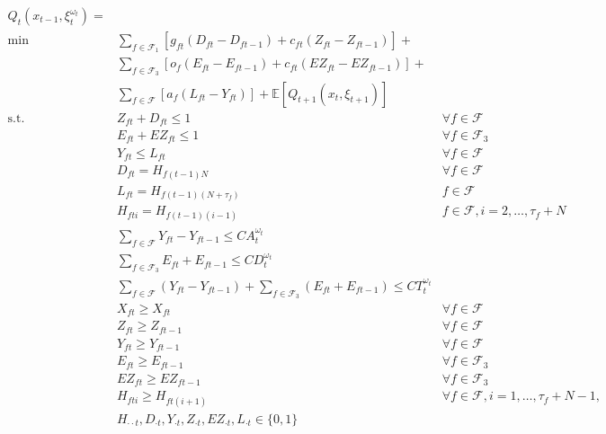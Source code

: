 \documentclass[12pt]{article}
\begin{document}
	\begin{subequations}
		\begin{align}
		Q_t(x_{t-1}, \xi^{\omega_t}_t)  = & &\\
		\min \quad & \sum_{f \in \mathcal{F}_1} \left[ g_{ft} (D_{ft} - D_{ft - 1}) + c_{ft} (Z_{ft} - Z_{ft - 1}) \right]  + & \nonumber \\
		& \sum_{f \in \mathcal{F}_3} \left[ o_f(E_{ft} - E_{ft - 1}) + c_{ft}(EZ_{ft} - EZ_{ft - 1}) \right] + & \nonumber\\ 
		& \sum_{f \in \mathcal{F}} \left[ a_f (L_{ft} - Y_{ft})\right]  + \mathbb{E}\left[Q_{t+1}(x_{t},\xi_{t+1}) \right] &\\
		\text{s.t.} \quad & Z_{ft} + D_{ft} \leq 1 & \forall f \in \mathcal{F} \label{cons:cancelORTOt}\\
		& E_{ft} + EZ_{ft} \leq 1 & \forall f \in \mathcal{F}_3 \label{cons:cancelTO2t}\\
		& Y_{ft} \leq L_{ft} & \forall f \in \mathcal{F} \label{cons:arrlandt}\\
		& D_{ft} = H_{f(t-1)N} & \forall f \in \mathcal{F} \label{cons:TOHistt1}\\
		& L_{ft} = H_{f(t-1)(N+\tau_{f})}& f \in \mathcal{F} \label{cons:landHistt}\\
		& H_{fti} = H_{f(t-1)(i-1)} & f \in \mathcal{F}, i = 2, \dots, \tau_{f} + N \label{cons:planHistt}\\
		& \sum_{f \in \mathcal{F}} Y_{ft} - Y_{ft - 1} \leq CA^{\omega_t}_t & \label{cons:arrCapt}\\
		& \sum_{f \in \mathcal{F}_3} E_{ft} + E_{ft - 1} \leq CD^{\omega_t}_t &\label{cons:deptCapt}\\
		& \sum_{f \in \mathcal{F}} (Y_{ft} - Y_{ft - 1}) + \sum_{f \in \mathcal{F}_3} (E_{ft} + E_{ft - 1}) \leq CT^{\omega_t}_t & \label{cons:totCapt}\\
		& X_{ft} \geq X_{ft} & \forall f \in \mathcal{F} \label{cons:transXt}\\
		& Z_{ft} \geq Z_{ft - 1} & \forall f \in \mathcal{F} \label{cons:transZt}\\
		& Y_{ft} \geq Y_{ft - 1} & \forall f \in \mathcal{F} \label{cons:transYt}\\
		& E_{ft} \geq E_{ft - 1} & \forall f \in \mathcal{F}_3 \label{cons:transEt}\\
		& EZ_{ft} \geq EZ_{ft - 1} & \forall f \in \mathcal{F}_3 \label{cons:transEZt}\\
		& H_{fti} \geq H_{ft(i+1)} & \forall f \in \mathcal{F}, i = 1, \dots, \tau_{f} + N -1, \label{cons:transHt}\\
		& H_{\cdot \cdot t}, D_{\cdot t}, Y_{\cdot t}, Z_{\cdot t}, EZ_{\cdot t}, L_{\cdot t} \in \{0,1\}& \label{cons:binaryt}
		\end{align}
	\end{subequations}
\end{document}
